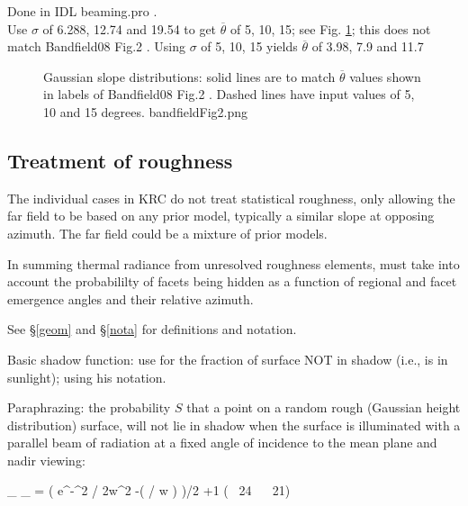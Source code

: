 \documentclass{article}
\newcommand{\erfc}{\mathrm{erfc}}  %
\newcommand{\qeq}{\hspace{25.mm}} %
\begin{document}
Done in IDL beaming.pro . \\ Use $\sigma$ of 6.288, 12.74 and 19.54 to get
$\overline{\theta}$ of 5, 10, 15; see Fig. \ref{bandfieldFig2}; this does not
match Bandfield08 Fig.2 .  Using $\sigma$ of 5, 10, 15 yields
$\overline{\theta}$ of 3.98, 7.9 and 11.7

\begin{figure}[!ht] 
\caption[Gaussian slopes ]{Gaussian slope distributions: solid lines are to
  match $\overline{\theta}$ values shown in labels of Bandfield08 Fig.2 . Dashed
  lines have input values of 5, 10 and 15 degrees.
\label{bandfieldFig2} bandfieldFig2.png  }
\end{figure} 

\pagebreak
\subsection{Treatment of roughness}  %

The individual cases in KRC do not treat statistical roughness, only allowing
the far field to be based on any prior model, typically a similar slope at
opposing azimuth. The far field could be a mixture of prior models.

In summing thermal radiance from unresolved roughness elements, must take into
account the probabililty of facets being hidden as a function of regional and
facet emergence angles and their relative azimuth.

 See \S \ref{geom} and \S \ref{nota} for definitions and notation.

Basic shadow function: use  for the fraction of surface NOT in 
shadow (i.e., is in sunlight); using his notation. %

Paraphrazing: the probability $S$ that a point on a random rough (Gaussian height
distribution) surface, will not lie in shadow when the surface is illuminated
with a parallel beam of radiation at a fixed angle of incidence to the mean
plane and nadir viewing:

\qbn {}_{} \Leftarrow  {}_{} = \frac{ 1- \frac{1}{2} \erfc \left( \mu / \sqrt{2} w \right) } 
{\left(  \cdot {}
e^{-\mu^2 / 2w^2} -\erfc \left(  \mu /  w \right) \right)/2  +1 } \qeq ( \ 24 \  \ 21) \qen
\end{document}
